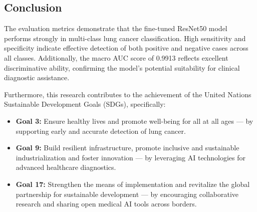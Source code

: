 
\subsection{Conclusion}

The evaluation metrics demonstrate that the fine-tuned ResNet50 model performs strongly in 
multi-class lung cancer classification. High sensitivity and specificity indicate effective 
detection of both positive and negative cases across all classes. Additionally, the macro AUC score 
of 0.9913 reflects excellent discriminative ability, confirming the model's potential suitability 
for clinical diagnostic assistance.

Furthermore, this research contributes to the achievement of the United Nations Sustainable 
Development Goals (SDGs), specifically:

\begin{itemize}
    \item \textbf{Goal 3:} Ensure healthy lives and promote well-being for all at all ages — by 
    supporting early and accurate detection of lung cancer.
    \item \textbf{Goal 9:} Build resilient infrastructure, promote inclusive and sustainable 
    industrialization and foster innovation — by leveraging AI technologies for advanced healthcare 
    diagnostics.
    \item \textbf{Goal 17:} Strengthen the means of implementation and revitalize the global 
    partnership for sustainable development — by encouraging collaborative research and sharing open 
    medical AI tools across borders.
\end{itemize}

